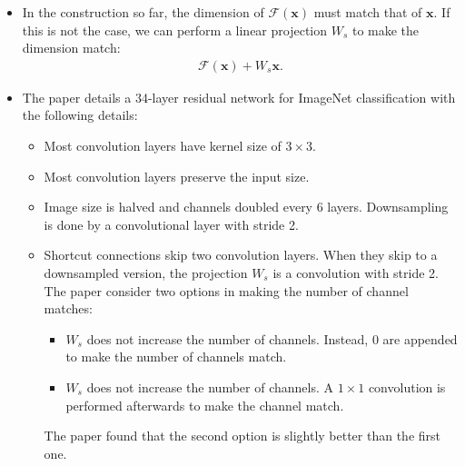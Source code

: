 \documentclass[10pt]{article}
\newcommand{\ve}[1]{\mathbf{#1}}
\begin{document}
\begin{itemize}
  	\item In the construction so far, the dimension of $\mathcal{F}(\ve{x})$ must match that of $\ve{x}$. If this is not the case, we can perform a linear projection $W_s$ to make the dimension match:
  	\begin{align*}
  		\mathcal{F}(\ve{x}) + W_s \ve{x}.
  	\end{align*}

  	\item The paper details a 34-layer residual network for ImageNet classification with the following details:
  	\begin{itemize}
  		\item Most convolution layers have kernel size of $3 \times 3$.

  		\item Most convolution layers preserve the input size.

  		\item Image size is halved and channels doubled every 6 layers. Downsampling is done by a convolutional layer with stride 2.

  		\item Shortcut connections skip two convolution layers. When they skip to a downsampled version, the projection $W_s$ is a convolution with stride 2. The paper consider two options in making the number of channel matches:
  		\begin{itemize}
  			\item $W_s$ does not increase the number of channels. Instead, $0$ are appended to make the number of channels match.
  			\item $W_s$ does not increase the number of channels. A $1\times 1$ convolution is performed afterwards to make the channel match.
  		\end{itemize}
  		The paper found that the second option is slightly better than the first one.
  	\end{itemize}
  \end{itemize}

  
    
\end{document}
